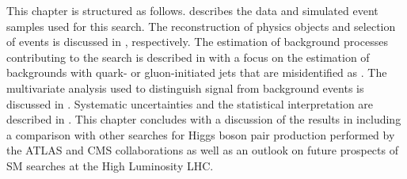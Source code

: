 This chapter is structured as follows. 
describes the data and simulated event samples used for this
search. The reconstruction of physics objects and selection of events
is discussed in ,
respectively. The estimation of background processes contributing to
the search is described in  with a
focus on the estimation of backgrounds with quark- or gluon-initiated
jets that are misidentified as \tauhadvis. The multivariate analysis
used to distinguish signal from background events is discussed in
. Systematic uncertainties and the
statistical interpretation are described in
. This chapter
concludes with a discussion of the results in
 including a comparison with other
searches for Higgs boson pair production performed by the ATLAS and
CMS collaborations as well as an outlook on future prospects of SM \HH
searches at the High Luminosity LHC.


